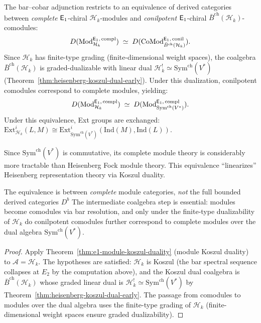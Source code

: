 \begin{corollary}
\label{cor:heisenberg-module-equivalence}
The bar--cobar adjunction restricts to an equivalence of derived categories
between \emph{complete} $\mathsf{E}_1$-chiral $\mathcal{H}_k$-modules and
\emph{conilpotent} $\mathsf{E}_1$-chiral $\bar{B}^{\mathrm{ch}}(\mathcal{H}_k)$-comodules:
\begin{equation}
D(\mathrm{Mod}^{\mathsf{E}_1,\,\mathrm{compl}}_{\mathcal{H}_k})
\;\simeq\;
D(\mathrm{CoMod}^{\mathsf{E}_1,\,\mathrm{conil}}_{\bar{B}^{\mathrm{ch}}(\mathcal{H}_k)}).
\end{equation}
Since $\mathcal{H}_k$ has finite-type grading (finite-dimensional weight spaces),
the coalgebra $\bar{B}^{\mathrm{ch}}(\mathcal{H}_k)$ is graded-dualizable with
linear dual $\mathcal{H}_k^! \simeq \mathrm{Sym}^{\mathrm{ch}}(V^*)$
(Theorem~\ref{thm:heisenberg-koszul-dual-early}). Under this dualization,
conilpotent comodules correspond to complete modules, yielding:
\begin{equation}
D(\mathrm{Mod}^{\mathsf{E}_1,\,\mathrm{compl}}_{\mathcal{H}_k})
\;\simeq\;
D(\mathrm{Mod}^{\mathsf{E}_1,\,\mathrm{compl}}_{\mathrm{Sym}^{\mathrm{ch}}(V^*)}).
\end{equation}
Under this equivalence, Ext groups are exchanged:
$\mathrm{Ext}^i_{\mathcal{H}_k}(L, M) \cong
\mathrm{Ext}^i_{\mathrm{Sym}^{\mathrm{ch}}(V^*)}(\mathrm{Ind}(M), \mathrm{Ind}(L))$.

Since $\mathrm{Sym}^{\mathrm{ch}}(V^*)$ is commutative, its complete module theory
is considerably more tractable than Heisenberg Fock module theory.  This equivalence
``linearizes'' Heisenberg representation theory via Koszul duality.
\end{corollary}

\begin{remark}
The equivalence is between \emph{complete} module categories,
\emph{not} the full bounded derived categories $D^b$
The intermediate
coalgebra step is essential: modules become comodules via bar resolution,
and only under the finite-type dualizability of $\mathcal{H}_k$
do conilpotent comodules further correspond to complete modules over the
dual algebra $\mathrm{Sym}^{\mathrm{ch}}(V^*)$.
\end{remark}

\begin{proof}
Apply Theorem~\ref{thm:e1-module-koszul-duality} (module Koszul duality) to
$\mathcal{A} = \mathcal{H}_k$.  The hypotheses are satisfied: $\mathcal{H}_k$
is Koszul (the bar spectral sequence collapses at $E_2$ by the computation above), and
the Koszul dual coalgebra is $\bar{B}^{\mathrm{ch}}(\mathcal{H}_k)$ whose
graded linear dual is $\mathcal{H}_k^! \simeq \mathrm{Sym}^{\mathrm{ch}}(V^*)$ by
Theorem~\ref{thm:heisenberg-koszul-dual-early}.  The passage from comodules to
modules over the dual algebra uses the finite-type grading of $\mathcal{H}_k$
(finite-dimensional weight spaces ensure graded dualizability).
\end{proof}


